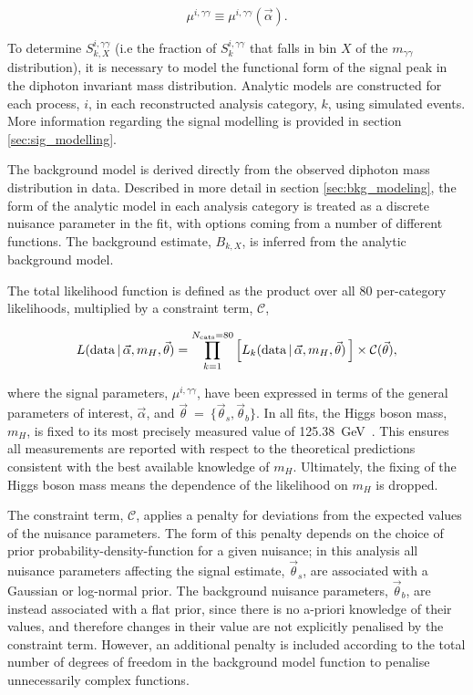 \begin{equation}
    \mu^{i,\gamma\gamma} \equiv \mu^{i,\gamma\gamma}(\vec{\alpha}).
\end{equation}

To determine $S_{k,X}^{i,\gamma\gamma}$ (i.e the fraction of $S_k^{i,\gamma\gamma}$ that falls in bin $X$ of the $m_{\gamma\gamma}$ distribution), it is necessary to model the functional form of the signal peak in the diphoton invariant mass distribution. Analytic models are constructed for each process, $i$, in each reconstructed analysis category, $k$, using simulated events. More information regarding the signal modelling is provided in section \ref{sec:sig_modelling}.

The background model is derived directly from the observed diphoton mass distribution in data. Described in more detail in section \ref{sec:bkg_modeling}, the form of the analytic model in each analysis category is treated as a discrete nuisance parameter in the fit, with options coming from a number of different functions. The background estimate, $B_{k,X}$, is inferred from the analytic background model.

The total likelihood function is defined as the product over all 80 per-category likelihoods, multiplied by a constraint term, $\mathcal{C}$,

\begin{equation}
    L({\rm{data}}\,|\,\vec{\alpha},m_H,\vec{\theta}) = \prod_{k=1}^{N_{\rm{cats}}=80} \Big[    L_k({\rm{data}}\,|\,\vec{\alpha},m_H,\vec{\theta}) \,\Big] \times \mathcal{C}(\vec{\theta}) ,
\end{equation}

\noindent
where the signal parameters, $\mu^{i,\gamma\gamma}$, have been expressed in terms of the general parameters of interest, $\vec{\alpha}$, and $\vec{\theta}$~=~$\{\vec{\theta}_s,\vec{\theta}_b\}$. In all fits, the Higgs boson mass, $m_H$, is fixed to its most precisely measured value of 125.38~GeV~\cite{Sirunyan:2020xwk}. This ensures all measurements are reported with respect to the theoretical predictions consistent with the best available knowledge of $m_H$. Ultimately, the fixing of the Higgs boson mass means the dependence of the likelihood on $m_H$ is dropped.

The constraint term, $\mathcal{C}$, applies a penalty for deviations from the expected values of the nuisance parameters. The form of this penalty depends on the choice of prior probability-density-function for a given nuisance; in this analysis all nuisance parameters affecting the signal estimate, $\vec{\theta}_s$, are associated with a Gaussian or log-normal prior. The background nuisance parameters, $\vec{\theta}_b$, are instead associated with a flat prior, since there is no a-priori knowledge of their values, and therefore changes in their value are not explicitly penalised by the constraint term. However, an additional penalty is included according to the total number of degrees of freedom in the background model function to penalise unnecessarily complex functions.

